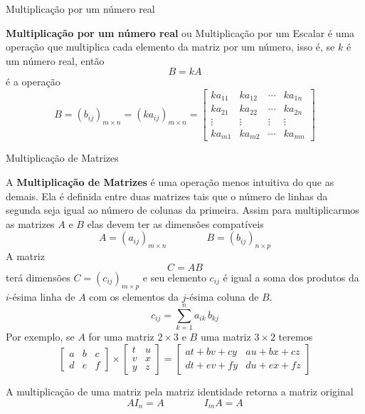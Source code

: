 \begin{teoria}{Multiplicação por um número real}
        
    \textbf{Multiplicação por um número real} ou Multiplicação por um Escalar é uma operação que multiplica cada elemento da matriz por um número, 
    isso é, se $k$ é um número real, então \[B=kA\] é a operação
    \[ B = (b_{ij})_{m\times n} = (ka_{ij})_{m\times n} =
        \left[
        \begin{array}{cccc}
            k a_{11} & k a_{12} & \cdots & k a_{1n} \\
            k a_{21} & k a_{22} & \cdots & k a_{2n} \\
            \vdots   &   \vdots & \vdots &   \vdots \\
            k a_{m1} & k a_{m2} & \cdots & k a_{mn}
        \end{array}
        \right]
    \]    
    
\end{teoria}

\begin{teoria}{Multiplicação de Matrizes}
    
    A \textbf{Multiplicação de Matrizes} é uma operação menos intuitiva do que as demais. 
    Ela é definida entre duas matrizes tais que o número de linhas da segunda seja igual ao número de colunas da primeira.
    Assim para multiplicarmos as matrizes $A$ e $B$ elas devem ter as dimensões compatíveis
    \[ A=(a_{ij})_{m\times n} \qquad\qquad B=(b_{ij})_{n\times p} \]
    A matriz \[C=AB\] terá dimensões $C = (c_{ij})_{m\times p}$ e seu elemento $c_{ij}$ é igual a soma dos produtos da $i$-ésima linha de $A$ 
    com os elementos da $j$-ésima coluna de $B$.
    \[ c_{ij} = \sum_{k=1}^{n} a_{ik}\,b_{kj}  \]
    Por exemplo, se $A$ for uma matriz $2\times3$ e $B$ uma matriz $3\times2$ teremos
    \[
        \left[\begin{array}{ccc}
            a & b & c \\ 
            d & e & f
        \end{array} \right]
        \times
        \left[\begin{array}{cc}
            t & u \\ 
            v & x \\ 
            y & z
        \end{array} \right]
        =
        \left[\begin{array}{cc}
            at+bv+cy & au+bx+cz \\ 
            dt+ev+fy & du+ex+fz
        \end{array} \right]
    \]
    
    A multiplicação de uma matriz pela matriz identidade retorna a matriz original
    \[ AI_n = A \qquad\qquad I_mA=A  \]
    
\end{teoria}

